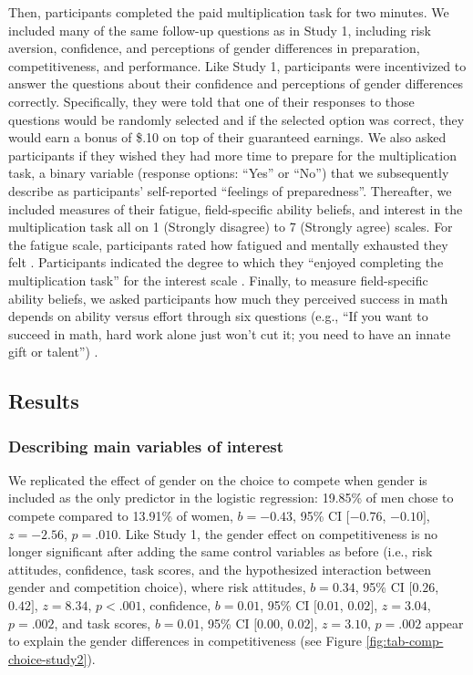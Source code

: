 \documentclass[a4paper, nobind]{templates/ociamthesis}
\begin{document}
Then, participants completed the paid multiplication task for two minutes. We included many of the same follow-up questions as in Study 1, including risk aversion, confidence, and perceptions of gender differences in preparation, competitiveness, and performance. Like Study 1, participants were incentivized to answer the questions about their confidence and perceptions of gender differences correctly. Specifically, they were told that one of their responses to those questions would be randomly selected and if the selected option was correct, they would earn a bonus of \$.10 on top of their guaranteed earnings. We also asked participants if they wished they had more time to prepare for the multiplication task, a binary variable (response options: ``Yes'' or ``No'') that we subsequently describe as participants' self-reported ``feelings of preparedness''. Thereafter, we included measures of their fatigue, field-specific ability beliefs, and interest in the multiplication task all on 1 (Strongly disagree) to 7 (Strongly agree) scales. For the fatigue scale, participants rated how fatigued and mentally exhausted they felt \autocite{Milyavskaya2018}. Participants indicated the degree to which they ``enjoyed completing the multiplication task'' for the interest scale \autocite{Milyavskaya2018}. Finally, to measure field-specific ability beliefs, we asked participants how much they perceived success in math depends on ability versus effort through six questions (e.g., ``If you want to succeed in math, hard work alone just won't cut it; you need to have an innate gift or talent'') \autocite{Meyer2015}.

\hypertarget{results-1}{%
\subsection{Results}\label{results-1}}

\hypertarget{describing-main-variables-of-interest-1}{%
\subsubsection{Describing main variables of interest}\label{describing-main-variables-of-interest-1}}

We replicated the effect of gender on the choice to compete when gender is included as the only predictor in the logistic regression: 19.85\% of men chose to compete compared to 13.91\% of women, \(b = -0.43\), 95\% CI \([-0.76\), \(-0.10]\), \(z = -2.56\), \(p = .010\). Like Study 1, the gender effect on competitiveness is no longer significant after adding the same control variables as before (i.e., risk attitudes, confidence, task scores, and the hypothesized interaction between gender and competition choice), where risk attitudes, \(b = 0.34\), 95\% CI \([0.26\), \(0.42]\), \(z = 8.34\), \(p < .001\), confidence, \(b = 0.01\), 95\% CI \([0.01\), \(0.02]\), \(z = 3.04\), \(p = .002\), and task scores, \(b = 0.01\), 95\% CI \([0.00\), \(0.02]\), \(z = 3.10\), \(p = .002\) appear to explain the gender differences in competitiveness (see Figure \ref{fig:tab-comp-choice-study2}).
\end{document}
